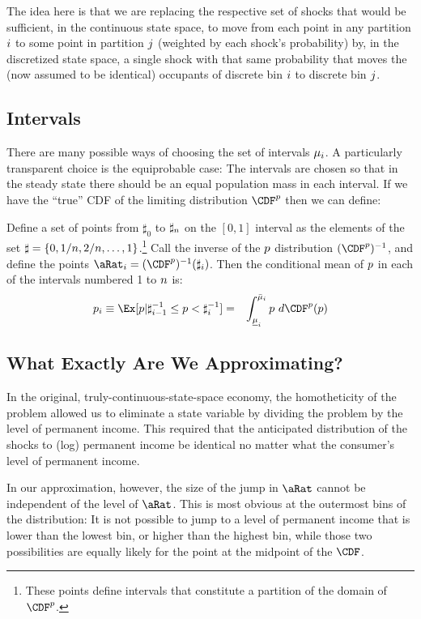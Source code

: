 \documentclass[../BufferStockTheory.tex]{subfiles}\usepackage{ApndxSteadyState}
\begin{document}
  The idea here is that we are replacing the respective set of shocks that would be sufficient, in the continuous state space, to move from each point in any partition $i$ to some point in partition $j$ (weighted by each shock's probability) by, in the discretized state space, a single shock with that same probability that moves the (now assumed to be identical) occupants of discrete bin ${i}$ to discrete bin ${j}$.

  \subsection{Intervals}

  There are many possible ways of choosing the set of intervals $\mu_{i}$.  A particularly transparent choice is the equiprobable case: The intervals are chosen so that in the steady state there should be an equal population mass in each interval.  If we have the ``true'' CDF of the limiting distribution $\CDF^{\pLog}$ then we can define:

  Define a set of points from $\sharp_{0}$ to $\sharp_{n}$ on the $[0,1]$ interval as the elements of the set $\sharp = \{0,1/n,2/n, \ldots,1\}$.\footnote{These points define intervals that constitute a partition of the domain of $\CDF^{\pLog}$.}  Call the inverse of the $p$ distribution $(\CDF^{\pLog})^{-1}$, and define the points $\point_{\this} = (\CDF^{\pLog})^{-1}(\sharp_{\this})$.  Then the conditional mean of $p$ in each of the intervals numbered 1 to $n$ is:
\begin{eqnarray}
        \pLog_{\this} \equiv \Ex[\pLog | \sharp_{\this-1}^{-1} \leq \pLog < \sharp_{\this}^{-1}] & = & \int_{\Bot{\SetSub}_{\this}}^{\Top{\SetSub}_{\this}} \pLog ~ d\CDF^{\pLog}(\pLog)
\end{eqnarray}


  \subsection{What Exactly Are We Approximating?}

  In the original, truly-continuous-state-space economy, the homotheticity of the problem allowed us to eliminate a state variable by dividing the problem by the level of permanent income.  This required that the anticipated distribution of the shocks to (log) permanent income be identical no matter what the consumer's level of permanent income.

  In our approximation, however, the size of the jump in $\point$ cannot be independent of the level of $\point$.  This is most obvious at the outermost bins of the distribution: It is not possible to jump to a level of permanent income that is lower than the lowest bin, or higher than the highest bin, while those two possibilities are equally likely for the point at the midpoint of the $\CDF$.  
\end{document}
